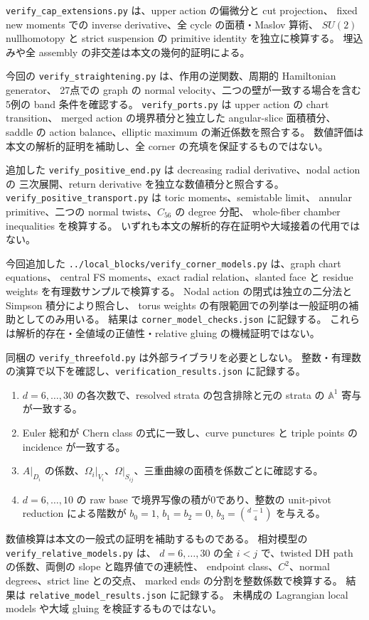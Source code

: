 \documentclass[11pt,a4paper]{article}
\theoremstyle{definition}
\begin{document}
\texttt{verify\_cap\_extensions.py} は、upper action の偏微分と cut projection、
fixed new moments での inverse derivative、全 cycle の面積・Maslov 算術、
$SU(2)$ nullhomotopy と strict suspension の primitive identity を独立に検算する。
埋込みや全 assembly の非交差は本文の幾何的証明による。

今回の \texttt{verify\_straightening.py} は、作用の逆関数、周期的 Hamiltonian generator、
27点での graph の normal velocity、二つの壁が一致する場合を含む5例の band 条件を確認する。
\texttt{verify\_ports.py} は upper action の chart transition、
merged action の境界積分と独立した angular-slice 面積積分、
saddle の action balance、elliptic maximum の漸近係数を照合する。
数値評価は本文の解析的証明を補助し、全 corner の充填を保証するものではない。


追加した \texttt{verify\_positive\_end.py} は decreasing radial derivative、nodal action の
三次展開、return derivative を独立な数値積分と照合する。
\texttt{verify\_positive\_transport.py} は toric moments、semistable limit、
annular primitive、二つの normal twists、$C_{56}$ の degree 分配、
whole-fiber chamber inequalities を検算する。
いずれも本文の解析的存在証明や大域接着の代用ではない。


今回追加した \texttt{../local\_blocks/verify\_corner\_models.py} は、graph chart equations、
central FS moments、exact radial relation、slanted face と residue weights を有理数サンプルで検算する。
Nodal action の閉式は独立の二分法と Simpson 積分により照合し、
torus weights の有限範囲での列挙は一般証明の補助としてのみ用いる。
結果は \texttt{corner\_model\_checks.json} に記録する。
これらは解析的存在・全値域の正値性・relative gluing の機械証明ではない。

同梱の \texttt{verify\_threefold.py} は外部ライブラリを必要としない。
整数・有理数の演算で以下を確認し、\texttt{verification\_results.json} に記録する。
\begin{enumerate}
\item $d=6,\ldots,30$ の各次数で、resolved strata の包含排除と元の strata の $\mathbb A^1$ 寄与が一致する。
\item Euler 総和が Chern class の式に一致し、curve punctures と triple points の incidence が一致する。
\item $A|_{D_i}$ の係数、$\Omega_i|_{V_i}$、$\Omega|_{S_{ij}}$、三重曲線の面積を係数ごとに確認する。
\item $d=6,\ldots,10$ の raw base で境界写像の積が0であり、整数の unit-pivot reduction による階数が
$b_0=1$, $b_1=b_2=0$, $b_3=\binom{d-1}{4}$ を与える。
\end{enumerate}
数値検算は本文の一般式の証明を補助するものである。
相対模型の \texttt{verify\_relative\_models.py} は、
$d=6,\ldots,30$ の全 $i<j$ で、twisted DH path の係数、両側の slope と臨界値での連続性、
endpoint class、$C^2$、normal degrees、strict line との交点、
marked ends の分割を整数係数で検算する。
結果は \texttt{relative\_model\_results.json} に記録する。
未構成の Lagrangian local models や大域 gluing を検証するものではない。
\end{document}

